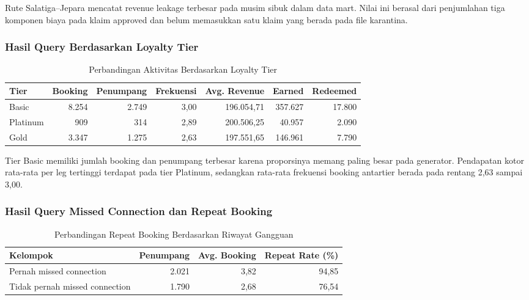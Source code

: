 Rute Salatiga--Jepara mencatat revenue leakage terbesar pada musim sibuk dalam
data mart. Nilai ini berasal dari penjumlahan tiga komponen biaya pada klaim
approved dan belum memasukkan satu klaim yang berada pada file karantina.

\subsubsection{Hasil Query Berdasarkan Loyalty Tier}

\begin{table}[htbp]
\centering
\scriptsize
\caption{Perbandingan Aktivitas Berdasarkan Loyalty Tier}
\label{tab:hasil-bq4}
\begin{tabular}{|l|r|r|r|r|r|r|}
\hline
\textbf{Tier} & \textbf{Booking} & \textbf{Penumpang} & \textbf{Frekuensi} &
\textbf{Avg. Revenue} & \textbf{Earned} & \textbf{Redeemed} \\
\hline
Basic & 8.254 & 2.749 & 3,00 & 196.054,71 & 357.627 & 17.800 \\
Platinum & 909 & 314 & 2,89 & 200.506,25 & 40.957 & 2.090 \\
Gold & 3.347 & 1.275 & 2,63 & 197.551,65 & 146.961 & 7.790 \\
\hline
\end{tabular}
\end{table}

Tier Basic memiliki jumlah booking dan penumpang terbesar karena proporsinya
memang paling besar pada generator. Pendapatan kotor rata-rata per leg tertinggi
terdapat pada tier Platinum, sedangkan rata-rata frekuensi booking antartier
berada pada rentang 2,63 sampai 3,00.

\subsubsection{Hasil Query Missed Connection dan Repeat Booking}

\begin{table}[htbp]
\centering
\small
\caption{Perbandingan Repeat Booking Berdasarkan Riwayat Gangguan}
\label{tab:hasil-bq5}
\begin{tabular}{|l|r|r|r|}
\hline
\textbf{Kelompok} & \textbf{Penumpang} & \textbf{Avg. Booking} &
\textbf{Repeat Rate (\%)} \\
\hline
Pernah missed connection & 2.021 & 3,82 & 94,85 \\
Tidak pernah missed connection & 1.790 & 2,68 & 76,54 \\
\hline
\end{tabular}
\end{table}


